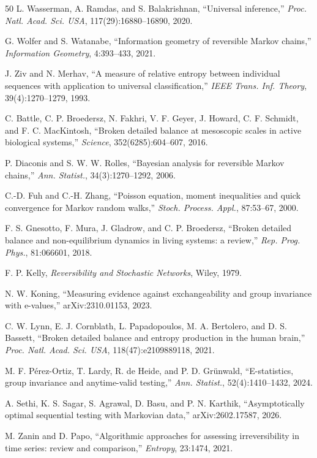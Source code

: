 \documentclass[11pt]{article}
\theoremstyle{definition}
\theoremstyle{remark}
\begin{document}
\begin{thebibliography}{50}
L. Wasserman, A. Ramdas, and S. Balakrishnan, ``Universal inference,'' \emph{Proc. Natl. Acad. Sci. USA}, 117(29):16880--16890, 2020.

G. Wolfer and S. Watanabe, ``Information geometry of reversible Markov chains,'' \emph{Information Geometry}, 4:393--433, 2021.

J. Ziv and N. Merhav, ``A measure of relative entropy between individual sequences with application to universal classification,'' \emph{IEEE Trans. Inf. Theory}, 39(4):1270--1279, 1993.

C. Battle, C. P. Broedersz, N. Fakhri, V. F. Geyer, J. Howard, C. F. Schmidt, and F. C. MacKintosh, ``Broken detailed balance at mesoscopic scales in active biological systems,'' \emph{Science}, 352(6285):604--607, 2016.

P. Diaconis and S. W. W. Rolles, ``Bayesian analysis for reversible Markov chains,'' \emph{Ann. Statist.}, 34(3):1270--1292, 2006.

C.-D. Fuh and C.-H. Zhang, ``Poisson equation, moment inequalities and quick convergence for Markov random walks,'' \emph{Stoch. Process. Appl.}, 87:53--67, 2000.

F. S. Gnesotto, F. Mura, J. Gladrow, and C. P. Broedersz, ``Broken detailed balance and non-equilibrium dynamics in living systems: a review,'' \emph{Rep. Prog. Phys.}, 81:066601, 2018.

F. P. Kelly, \emph{Reversibility and Stochastic Networks}, Wiley, 1979.

N. W. Koning, ``Measuring evidence against exchangeability and group invariance with e-values,'' arXiv:2310.01153, 2023.

C. W. Lynn, E. J. Cornblath, L. Papadopoulos, M. A. Bertolero, and D. S. Bassett, ``Broken detailed balance and entropy production in the human brain,'' \emph{Proc. Natl. Acad. Sci. USA}, 118(47):e2109889118, 2021.

M. F. P\'erez-Ortiz, T. Lardy, R. de Heide, and P. D. Gr\"unwald, ``E-statistics, group invariance and anytime-valid testing,'' \emph{Ann. Statist.}, 52(4):1410--1432, 2024.

A. Sethi, K. S. Sagar, S. Agrawal, D. Basu, and P. N. Karthik, ``Asymptotically optimal sequential testing with Markovian data,'' arXiv:2602.17587, 2026.

M. Zanin and D. Papo, ``Algorithmic approaches for assessing irreversibility in time series: review and comparison,'' \emph{Entropy}, 23:1474, 2021.

\end{thebibliography}
\end{document}
